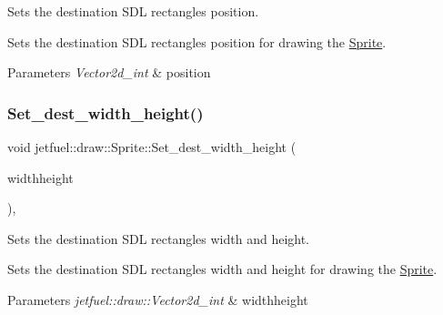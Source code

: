 Sets the destination S\+DL rectangle\textquotesingle{}s position. 

Sets the destination S\+DL rectangle\textquotesingle{}s position for drawing the \hyperlink{classjetfuel_1_1draw_1_1Sprite}{Sprite}.


\begin{DoxyParams}{Parameters}
{\em Vector2d\+\_\+int} & position \\
\hline
\end{DoxyParams}
\mbox{\label{classjetfuel_1_1draw_1_1Sprite_a089092a8511912f2b2c857ea111a29e6}} 
\subsubsection{\texorpdfstring{Set\+\_\+dest\+\_\+width\+\_\+height()}{Set\_dest\_width\_height()}}
{\footnotesize\ttfamily void jetfuel\+::draw\+::\+Sprite\+::\+Set\+\_\+dest\+\_\+width\+\_\+height (\begin{DoxyParamCaption}\item[{const \hyperlink{classjetfuel_1_1draw_1_1Vector2d}{Vector2d\+\_\+int}}]{widthheight }\end{DoxyParamCaption})\hspace{0.3cm}{\ttfamily [inline]}, {\ttfamily [protected]}}



Sets the destination S\+DL rectangle\textquotesingle{}s width and height. 

Sets the destination S\+DL rectangle\textquotesingle{}s width and height for drawing the \hyperlink{classjetfuel_1_1draw_1_1Sprite}{Sprite}.


\begin{DoxyParams}{Parameters}
{\em jetfuel\+::draw\+::\+Vector2d\+\_\+int} & widthheight \\
\hline
\end{DoxyParams}
\mbox{\label{classjetfuel_1_1draw_1_1Sprite_a0dfe3a796662980c612833768a785450}} 
